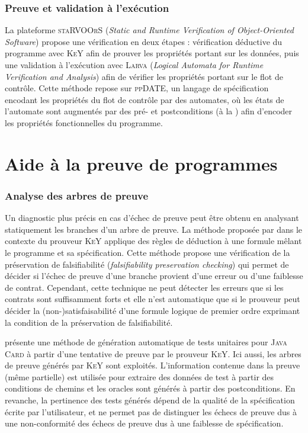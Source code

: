\subsubsection*{Preuve et validation à l'exécution}


La plateforme \textsc{staRVOOrS} ({\em Static and Runtime Verification
  of Object-Oriented Software}) \cite{Ahrendt/FM15} propose une vérification en
deux étapes : vérification déductive du programme avec \textsc{KeY} afin de
prouver les propriétés portant sur les données, puis une validation à
l'exécution avec \textsc{Larva} ({\em Logical Automata for Runtime Verification
  and Analysis}) afin de vérifier les propriétés portant sur le
flot de contrôle.
Cette méthode repose sur \textsc{ppDATE}, un langage de spécification encodant
les propriétés du flot de contrôle par des automates, où les états de
l'automate sont augmentés par des pré- et postconditions (à la \jml) afin
d'encoder les propriétés fonctionnelles du programme.


\section{Aide à la preuve de programmes}
\label{sec:art-proof}


\subsubsection*{Analyse des arbres de preuve}


Un diagnostic plus précis en cas d'échec de preuve peut être obtenu en analysant
statiquement les branches d'un arbre de preuve.
La méthode proposée par \cite{Gladisch/TAP09} dans le contexte du prouveur
\textsc{KeY} applique des règles de déduction à une formule mêlant le programme
et sa spécification.
Cette méthode propose une vérification de la préservation de falsifiabilité
({\em falsifiability preservation checking}) qui permet de décider si l'échec
de preuve d'une branche provient d'une erreur ou d'une faiblesse de contrat.
Cependant, cette technique ne peut détecter les erreurs que si les contrats sont
suffisamment forts et elle n'est automatique que si le prouveur peut décider la
(non-)satisfaisabilité d'une formule logique de premier ordre exprimant la
condition de la préservation de falsifiabilité.

\cite{Engel/TAP07} présente une méthode de génération automatique de tests
unitaires pour \textsc{Java Card} à partir d'une tentative de preuve par le
prouveur \textsc{KeY}.
Ici aussi, les arbres de preuve générés par \textsc{KeY} sont exploités.
L'information contenue dans la preuve (même partielle) est utilisée
pour extraire des données de test à partir des conditions de chemins et les
oracles sont générés à partir des postconditions.
En revanche, la pertinence des tests générés dépend de la qualité de la
spécification écrite par l'utilisateur, et ne permet pas de distinguer les
échecs de preuve dus à une non-conformité des échecs de preuve dus à une
faiblesse de spécification.


